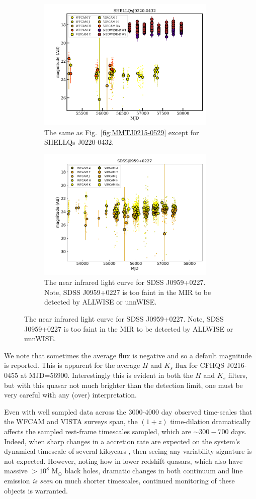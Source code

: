\documentclass[usenatbib]{mnras}
\begin{document}
\begin{figure}
  \begin{subfigure}{}\quad
    \centering
    \includegraphics[width=8.5cm]{../light_curves/SHELLQsJ0220-0432LC_20190214.png}
    \caption{The same as Fig.~\ref{fig:MMTJ0215-0529} except for SHELLQs J0220-0432.}
    \label{fig:SHELLQsJ0220-0432}
  \end{subfigure}
  \begin{subfigure}{}\quad
    \centering
    \includegraphics[width=8.5cm]{../light_curves/SDSSJ0959+0227LC_20190612.png}
    \caption{The near infrared light curve for SDSS J0959+0227. Note, 
      SDSS J0959+0227 is too faint in the MIR to be detected by ALLWISE or unnWISE.}
    \label{fig:SDSSJ0959+0227}
  \end{subfigure}
  \medskip
\end{figure}

We note that sometimes the average flux is negative and so a default
magnitude is reported.  This is apparent for the average $H$ and
$K_{s}$ flux for CFHQS J0216-0455 at MJD=56900.  Interestingly this is
evident in both the $H$ and $K_{s}$ filters, but with this quasar not
much brighter than the detection limit, one must be very careful with
any (over) interpretation.

Even with well sampled data across the 3000-4000 day observed
time-scales that the WFCAM and VISTA surveys span, the $(1+z)$
time-dilation dramatically affects the sampled rest-frame timescales
sampled, which are $\sim300-700$ days. Indeed, when sharp changes in a accretion rate are expected
on the system's dynamical timescale of several kiloyears
\citep[e.g.,][]{Regan2019}, then seeing any variability signature is
not expected. However, noting how in lower redshift quasars, which
also have massive $>10^{8}$ M$_{\odot}$ black holes, dramatic changes
in both continuum and line emission {\it is seen} on much shorter
timescales, continued monitoring of these objects is warranted.
\end{document}

